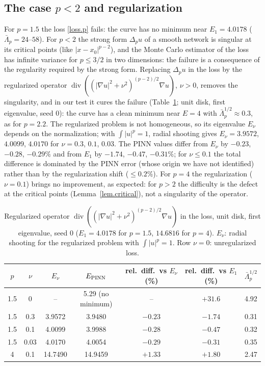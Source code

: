 \documentclass[10pt]{amsart}
\theoremstyle{definition}
\theoremstyle{remark}
\theoremstyle{plain}
\begin{document}
\subsection{The case \texorpdfstring{$p<2$}{p<2} and regularization}
For $p=1.5$ the loss \eqref{loss.p} fails: the curve has no minimum near $E_1=4.0178$
($\bar\Lambda_p=24$--$58$). For $p<2$ the strong form $\Delta_pu$ of a smooth network is singular at its
critical points (like $|x-x_0|^{p-2}$), and the Monte Carlo estimator of the loss has infinite variance
for $p\le3/2$ in two dimensions: the failure is a consequence of the regularity required by the strong
form. Replacing $\Delta_pu$ in the loss by the regularized operator
$\operatorname{div}((|\nabla u|^2+\nu^2)^{(p-2)/2}\nabla u)$, $\nu>0$, removes the singularity, and in our
test it cures the failure (Table~\ref{tab.plap.reg}; unit disk, first eigenvalue, seed 0): the curve has a
clean minimum near $E=4$ with $\bar\Lambda_p^{1/2}\approx0.3$, as for $p=2.2$. The regularized problem is
not homogeneous, so its eigenvalue $E_\nu$ depends on the normalization; with $\int|u|^p=1$, radial
shooting gives $E_\nu=3.9572$, $4.0099$, $4.0170$ for $\nu=0.3$, $0.1$, $0.03$. The PINN values differ from
$E_\nu$ by $-0.23$, $-0.28$, $-0.29\%$ and from $E_1$ by $-1.74$, $-0.47$, $-0.31\%$; for $\nu\le0.1$ the total
difference is dominated by the PINN error (whose origin we have not identified) rather than by the
regularization shift ($\le0.2\%$). For $p=4$ the regularization ($\nu=0.1$) brings no improvement, as
expected: for $p>2$ the difficulty is the defect at the critical points (Lemma~\ref{lem.critical}), not a
singularity of the operator.

\begin{table}[H]
\centering\small
\caption{Regularized operator $\operatorname{div}((|\nabla u|^2+\nu^2)^{(p-2)/2}\nabla u)$ in the loss, unit disk, first eigenvalue, seed 0 ($E_1=4.0178$ for $p=1.5$, $14.6816$ for $p=4$). $E_\nu$: radial shooting for the regularized problem with $\int|u|^p=1$. Row $\nu=0$: unregularized loss.}
\label{tab.plap.reg}
\begin{tabular}{ccccccc}
\toprule
$p$ & $\nu$ & $E_\nu$ & $E_{\rm PINN}$ & rel.\ diff.\ vs $E_\nu$ (\%) & rel.\ diff.\ vs $E_1$ (\%) & $\bar\Lambda_p^{1/2}$\\
\midrule
1.5 & 0 & -- & 5.29 (no minimum) & -- & $+31.6$ & 4.92\\
1.5 & 0.3 & 3.9572 & 3.9480 & $-0.23$ & $-1.74$ & 0.31\\
1.5 & 0.1 & 4.0099 & 3.9988 & $-0.28$ & $-0.47$ & 0.32\\
1.5 & 0.03 & 4.0170 & 4.0054 & $-0.29$ & $-0.31$ & 0.35\\
4 & 0.1 & 14.7490 & 14.9459 & $+1.33$ & $+1.80$ & 2.47\\
\bottomrule
\end{tabular}
\end{table}
\end{document}
